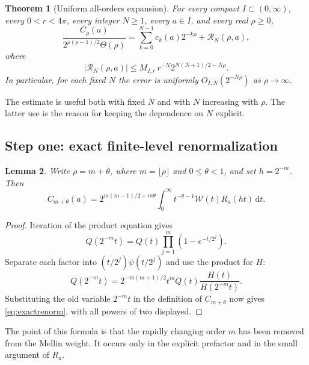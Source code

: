 \documentclass[11pt,letterpaper]{article}
\numberwithin{equation}{section}
\newtheorem{theorem}{Theorem}[section]
\newtheorem{lemma}[theorem]{Lemma}
\theoremstyle{definition}
\theoremstyle{remark}
\newcommand{\W}{\mathcal W}
\newcommand{\dd}{\,\mathrm d}
\begin{document}
\begin{theorem}[Uniform all-orders expansion]\label{thm:asymptotics}
For every compact $I\subset(0,\infty)$, every $0<r<4\pi$, every integer
$N\ge1$, every $a\in I$, and every real $\rho\ge0$,
\begin{equation}\label{eq:maintheorem}
 \frac{C_\rho(a)}{2^{\rho(\rho-1)/2}\Theta(\rho)}
   =\sum_{k=0}^{N-1}c_k(a)2^{-k\rho}+\mathcal R_N(\rho,a),
\end{equation}
where
\begin{equation}\label{eq:mainremainder}
 |\mathcal R_N(\rho,a)|
 \le M_{I,r}\,r^{-N}2^{N(N+1)/2-N\rho}.
\end{equation}
In particular, for each fixed $N$ the error is uniformly
$O_{I,N}(2^{-N\rho})$ as $\rho\to\infty$.
\end{theorem}

The estimate is useful both with fixed $N$ and with $N$ increasing with
$\rho$. The latter use is the reason for keeping the dependence on $N$
explicit.

\subsection{Step one: exact finite-level renormalization}
\begin{lemma}\label{lem:finitelevel}
Write $\rho=m+\theta$, where $m=\lfloor\rho\rfloor$ and $0\le\theta<1$,
and set $h=2^{-m}$. Then
\begin{equation}\label{eq:exactrenorm}
 C_{m+\theta}(a)
 =2^{m(m-1)/2+m\theta}
   \int_0^\infty t^{-\theta-1}\W(t)R_a(ht)\dd t.
\end{equation}
\end{lemma}
\begin{proof}
Iteration of the product equation gives
\[
 Q(2^{-m}t)=Q(t)\prod_{j=1}^m(1-e^{-t/2^j}).
\]
Separate each factor into $(t/2^j)\psi(t/2^j)$ and use the product for $H$:
\begin{equation}\label{eq:Qfinitelevel}
 Q(2^{-m}t)=2^{-m(m+1)/2}t^mQ(t)\frac{H(t)}{H(2^{-m}t)}.
\end{equation}
Substituting the old variable $2^{-m}t$ in the definition of $C_{m+\theta}$
now gives \eqref{eq:exactrenorm}, with all powers of two displayed.
\end{proof}

The point of this formula is that the rapidly changing order $m$ has been
removed from the Mellin weight. It occurs only in the explicit prefactor
and in the small argument of $R_a$.
\end{document}
